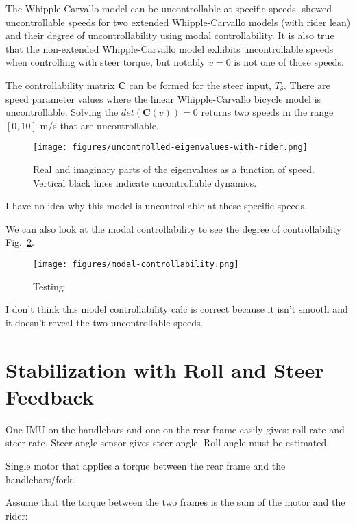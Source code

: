 \documentclass[12pt]{article}
\begin{document}
The Whipple-Carvallo model can be uncontrollable at specific speeds.
\cite{Schwab2010a} showed uncontrollable speeds for two extended
Whipple-Carvallo models (with rider lean) and their degree of uncontrollability
using modal controllability. It is also true that the non-extended
Whipple-Carvallo model exhibits uncontrollable speeds when controlling with
steer torque, but notably \(v=0\) is not one of those speeds.

The controllability matrix \(\mathbf{C}\) can be formed for the steer input,
\(T_\delta\). There are speed parameter values where the linear
Whipple-Carvallo bicycle model is uncontrollable. Solving the
\(det(\mathbf{C}(v))=0\) returns two speeds in the range \([0, 10]\) m/s that
are uncontrollable.

\begin{figure}
  \centering
  \texttt{[image: figures/uncontrolled-eigenvalues-with-rider.png]}
  \caption{Real and imaginary parts of the eigenvalues as a function of speed.
  Vertical black lines indicate uncontrollable dynamics.}
  \label{fig:uncontrolled-eigenvalues-with-rider}
\end{figure}

I have no idea why this model is uncontrollable at these specific speeds.

We can also look at the modal controllability to see the degree of
controllability Fig.~\ref{fig:modal-controllability}.

\begin{figure}
  \centering
  \texttt{[image: figures/modal-controllability.png]}
  \caption{Testing}
  \label{fig:modal-controllability}
\end{figure}

I don't think this model controllability calc is correct because it isn't
smooth and it doesn't reveal the two uncontrollable speeds.

\section{Stabilization with Roll and Steer Feedback}

One IMU on the handlebars and one on the rear frame easily gives: roll rate and
steer rate. Steer angle sensor gives steer angle. Roll angle must be estimated.

Single motor that applies a torque between the rear frame and the
handlebars/fork.

Assume that the torque between the two frames is the sum of the motor and the
rider:
\end{document}
